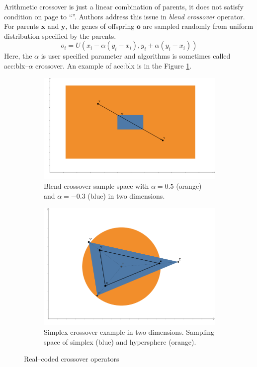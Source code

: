 Arithmetic crossover is just a linear combination of parents, it does not satisfy condition on page \pageref{enum:espopulationvariance} to \enquote{\snipescondition}. Authors \citet{BlendCrossoverOriginal} address this issue in \emph{blend crossover} operator. For parents $\mathbf{x}$ and $\mathbf{y}$, the genes of offspring $\mathbf{o}$ are sampled randomly from uniform distribution specified by the parents.
$$
o_i = U\left( 
    x_i - \alpha \left( y_i - x_i \right),
    y_i + \alpha \left( y_i - x_i \right)
\right)
$$
Here, the $\alpha$ is user specified parameter and algorithms is sometimes called \acrshort{acc:blx}--$\alpha$ crossover. An example of \acrshort{acc:blx} is in the Figure \ref{fig:blendcrossoverexample}.

\begin{figure}
    \begin{subfigure}[t]{0.45\textwidth}
        \includegraphics[width=\textwidth]{img/BLX.pdf}
        \caption{Blend crossover sample space with $\alpha=0.5$ (orange) and $\alpha=-0.3$ (blue) in two dimensions.}
        \label{fig:blendcrossoverexample}
    \end{subfigure}
    \hfill
    \begin{subfigure}[t]{0.45\textwidth}
        \includegraphics[width=\textwidth]{img/SimplexCrossover.pdf}
        \caption{Simplex crossover example in two dimensions. Sampling space of simplex (blue) and hypersphere (orange).}
        \label{fig:simplexcrossoverexample}
    \end{subfigure}
    \caption{Real--coded crossover operators}
\end{figure}

